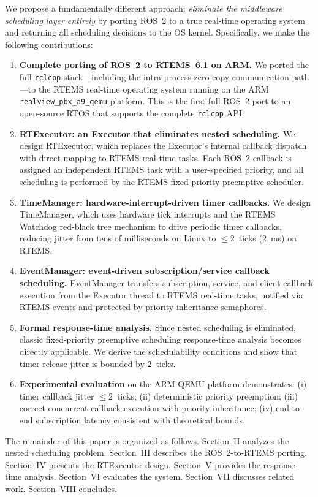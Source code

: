 We propose a fundamentally different approach: \emph{eliminate the middleware scheduling layer entirely} by porting ROS~2 to a true real-time operating system and returning all scheduling decisions to the OS kernel.
Specifically, we make the following contributions:

\begin{enumerate}
    \item \textbf{Complete porting of ROS~2 to RTEMS~6.1 on ARM.} We ported the full \texttt{rclcpp} stack---including the intra-process zero-copy communication path---to the RTEMS real-time operating system running on the ARM \texttt{realview\_pbx\_a9\_qemu} platform. This is the first full ROS~2 port to an open-source RTOS that supports the complete \texttt{rclcpp} API.

    \item \textbf{RTExecutor: an Executor that eliminates nested scheduling.} We design RTExecutor, which replaces the Executor's internal callback dispatch with direct mapping to RTEMS real-time tasks. Each ROS~2 callback is assigned an independent RTEMS task with a user-specified priority, and all scheduling is performed by the RTEMS fixed-priority preemptive scheduler.

    \item \textbf{TimeManager: hardware-interrupt-driven timer callbacks.} We design TimeManager, which uses hardware tick interrupts and the RTEMS Watchdog red-black tree mechanism to drive periodic timer callbacks, reducing jitter from tens of milliseconds on Linux to $\leqslant 2$~ticks ($2$~ms) on RTEMS.

    \item \textbf{EventManager: event-driven subscription/service callback scheduling.} EventManager transfers subscription, service, and client callback execution from the Executor thread to RTEMS real-time tasks, notified via RTEMS events and protected by priority-inheritance semaphores.

    \item \textbf{Formal response-time analysis.} Since nested scheduling is eliminated, classic fixed-priority preemptive scheduling response-time analysis becomes directly applicable. We derive the schedulability conditions and show that timer release jitter is bounded by $2$~ticks.

    \item \textbf{Experimental evaluation} on the ARM QEMU platform demonstrates: (i) timer callback jitter $\leqslant 2$~ticks; (ii) deterministic priority preemption; (iii) correct concurrent callback execution with priority inheritance; (iv) end-to-end subscription latency consistent with theoretical bounds.
\end{enumerate}

The remainder of this paper is organized as follows. Section~II analyzes the nested scheduling problem. Section~III describes the ROS~2-to-RTEMS porting. Section~IV presents the RTExecutor design. Section~V provides the response-time analysis. Section~VI evaluates the system. Section~VII discusses related work. Section~VIII concludes.
